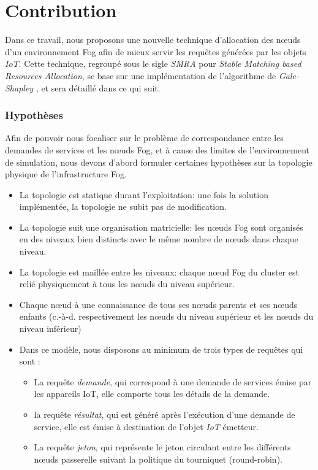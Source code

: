 \section{Contribution}
Dans ce travail, nous proposons une nouvelle technique d'allocation des nœuds d'un environnement Fog afin de mieux servir les requêtes générées par les objets \emph{IoT}. Cette technique, regroupé sous le sigle \emph{SMRA} pour \emph{Stable Matching based Resources Allocation}, se base sur une implémentation de l'algorithme de \emph{Gale-Shapley} \cite{gale-shapley}, et sera détaillé dans ce qui suit.\par


\subsubsection{Hypothèses}
Afin de pouvoir nous focaliser sur le problème de correspondance entre les demandes de services et les nœuds Fog, et à cause des limites de l'environnement de simulation, nous devons d'abord formuler certaines hypothèses sur la topologie physique de l'infrastructure Fog.


\begin{itemize}
    \item La topologie est statique durant l'exploitation: une fois la solution implémentée, la topologie ne subit pas de modification.
    \item La topologie suit une organisation matricielle: les nœuds Fog sont organisés en des niveaux bien distincts avec le même nombre de nœuds dans chaque niveau.
    \item La topologie est maillée entre les niveaux: chaque nœud Fog du cluster est relié physiquement à tous les nœuds du niveau supérieur.
    \item Chaque nœud à une connaissance de tous ses nœuds parents et ses nœuds enfants (c.-à-d. respectivement les nœuds du niveau supérieur et les nœuds du niveau inférieur)
    \item Dans ce modèle, nous disposons au minimum de trois types de requêtes qui sont : \\
          \begin{itemize}
             \item La requête \emph{demande}, qui correspond à une demande de services émise par les appareils IoT, elle comporte tous les détails de la demande.
             \item la requête \emph{résultat}, qui est généré après l'exécution d'une demande de service, elle est émise à destination de l'objet \emph{IoT} émetteur.
             \item La requête \emph{jeton}, qui représente le jeton circulant entre les différents nœuds passerelle suivant la politique du tourniquet (round-robin).
          \end{itemize}
\end{itemize}




